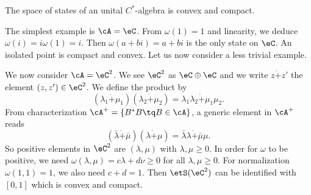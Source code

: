 \begin{proposition}
The space of states of an unital $C^*$-algebra is convex and compact.
\end{proposition}

The simplest example is $\cA=\eC$. From $\omega(1)=1$ and linearity, we deduce $\omega(i)=i\omega(1)=i$. Then $\omega(a+bi)=a+bi$ is the only state on $\eC$. An isolated point is compact and convex. Let us now consider a less trivial example.

We now consider $\cA=\eC^2$. We see $\eC^2$ as $\eC\oplus\eC$ and we write $z\dot + z'$ the element $(z,z')\in\eC^2$. We define the product by
\[ 
  (\lambda_1\dot +\mu_1)(\lambda_2\dot +\mu_2)=\lambda_1\lambda_2\dot +\mu_1\mu_2.
\]
From characterization $\cA^+=\{ B^*B\tq B\in\cA \}$, a generic element in $\cA^+$ reads
\[ 
  (\bar\lambda\dot +\bar\mu)(\lambda\dot +\mu)=\bar\lambda\lambda\dot +\bar\mu\mu.
\]
So positive elements in $\eC^2$ are $(\lambda,\mu)$ with $\lambda,\mu\geq 0$. In order for $\omega$ to be positive, we need $\omega(\lambda,\mu)=c\lambda+d\nu\geq 0$ for all $\lambda,\mu\geq0$. For normalization $\omega(1,1)=1$, we also need $c+d=1$. Then $\etS(\eC^2)$ can be identified with $[0,1]$ which is convex and compact.

